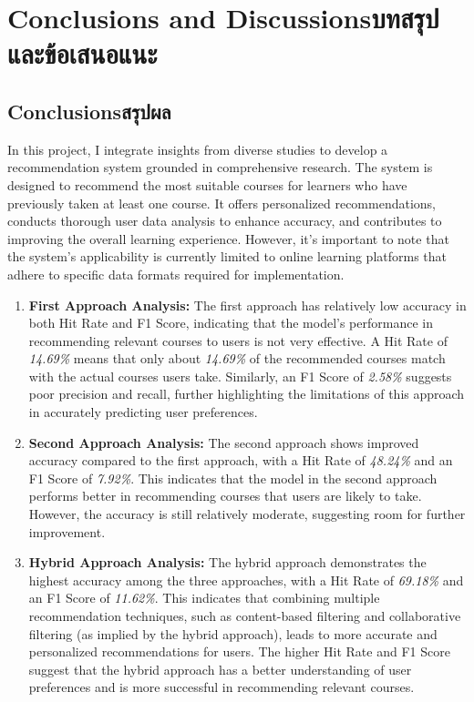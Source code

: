 \chapter{\ifenglish Conclusions and Discussions\else บทสรุปและข้อเสนอแนะ\fi}

\section{\ifenglish Conclusions\else สรุปผล\fi}

In this project, I integrate insights from diverse studies to develop a recommendation system grounded 
in comprehensive research. The system is designed to recommend the most suitable courses for learners 
who have previously taken at least one course. It offers personalized recommendations, conducts thorough 
user data analysis to enhance accuracy, and contributes to improving the overall learning experience. 
However, it's important to note that the system's applicability is currently limited to online learning 
platforms that adhere to specific data formats required for implementation.

\begin{enumerate}
    \item \textbf{First Approach Analysis:} The first approach has relatively low accuracy in both Hit 
    Rate and F1 Score, indicating that the model's performance in recommending relevant courses to users 
    is not very effective. A Hit Rate of \textit{14.69\%} means that only about \textit{14.69\%} of the recommended courses 
    match with the actual courses users take. Similarly, an F1 Score of \textit{2.58\%} suggests poor precision and 
    recall, further highlighting the limitations of this approach in accurately predicting user preferences.
    \item \textbf{Second Approach Analysis:} The second approach shows improved accuracy compared to the 
    first approach, with a Hit Rate of \textit{48.24\%} and an F1 Score of \textit{7.92\%}. This indicates that the model in 
    the second approach performs better in recommending courses that users are likely to take. However, 
    the accuracy is still relatively moderate, suggesting room for further improvement.
    \item \textbf{Hybrid Approach Analysis:} The hybrid approach demonstrates the highest accuracy among 
    the three approaches, with a Hit Rate of \textit{69.18\%} and an F1 Score of \textit{11.62\%}. This indicates that 
    combining multiple recommendation techniques, such as content-based filtering and collaborative filtering 
    (as implied by the hybrid approach), leads to more accurate and personalized recommendations for users. 
    The higher Hit Rate and F1 Score suggest that the hybrid approach has a better understanding of user 
    preferences and is more successful in recommending relevant courses.
\end{enumerate}

